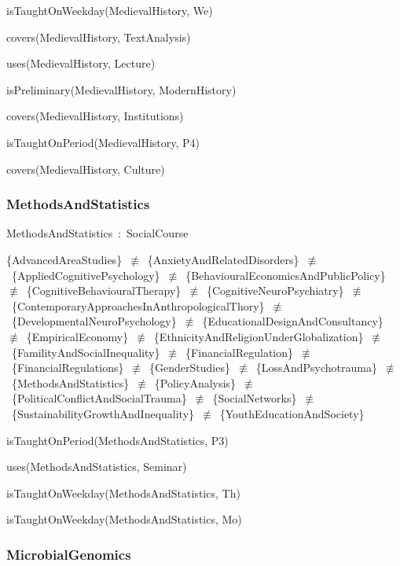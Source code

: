 \documentclass{article}
\begin{document}
isTaughtOnWeekday(MedievalHistory, We)

covers(MedievalHistory, TextAnalysis)

uses(MedievalHistory, Lecture)

isPreliminary(MedievalHistory, ModernHistory)

covers(MedievalHistory, Institutions)

isTaughtOnPeriod(MedievalHistory, P4)

covers(MedievalHistory, Culture)

\subsubsection*{MethodsAndStatistics}

MethodsAndStatistics~:~SocialCourse

\{AdvancedAreaStudies\}~\ensuremath{\not\equiv}~\{AnxietyAndRelatedDisorders\}~\ensuremath{\not\equiv}~\{AppliedCognitivePsychology\}~\ensuremath{\not\equiv}~\{BehaviouralEconomicsAndPublicPolicy\}~\ensuremath{\not\equiv}~\{CognitiveBehaviouralTherapy\}~\ensuremath{\not\equiv}~\{CognitiveNeuroPsychiatry\}~\ensuremath{\not\equiv}~\{ContemporaryApproachesInAnthropologicalThory\}~\ensuremath{\not\equiv}~\{DevelopmentalNeuroPsychology\}~\ensuremath{\not\equiv}~\{EducationalDesignAndConsultancy\}~\ensuremath{\not\equiv}~\{EmpiricalEconomy\}~\ensuremath{\not\equiv}~\{EthnicityAndReligionUnderGlobalization\}~\ensuremath{\not\equiv}~\{FamilityAndSocialInequality\}~\ensuremath{\not\equiv}~\{FinancialRegulation\}~\ensuremath{\not\equiv}~\{FinancialRegulations\}~\ensuremath{\not\equiv}~\{GenderStudies\}~\ensuremath{\not\equiv}~\{LossAndPsychotrauma\}~\ensuremath{\not\equiv}~\{MethodsAndStatistics\}~\ensuremath{\not\equiv}~\{PolicyAnalysis\}~\ensuremath{\not\equiv}~\{PoliticalConflictAndSocialTrauma\}~\ensuremath{\not\equiv}~\{SocialNetworks\}~\ensuremath{\not\equiv}~\{SustainabilityGrowthAndInequality\}~\ensuremath{\not\equiv}~\{YouthEducationAndSociety\}

isTaughtOnPeriod(MethodsAndStatistics, P3)

uses(MethodsAndStatistics, Seminar)

isTaughtOnWeekday(MethodsAndStatistics, Th)

isTaughtOnWeekday(MethodsAndStatistics, Mo)

\subsubsection*{MicrobialGenomics}
\end{document}
